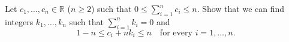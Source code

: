 Let $c_1, \ldots, c_n \in \mathbb{R}$ ($n \geq 2$) such that $0 \leq \sum_{i=1}^{n} c_i \leq n$. Show that we can find integers $k_1, \ldots, k_n$ such that $\sum_{i=1}^{n} k_i = 0$ and
\[ 1 - n \leq c_i + n k_i \leq n \quad \text{for every } i = 1, \ldots, n. \]
